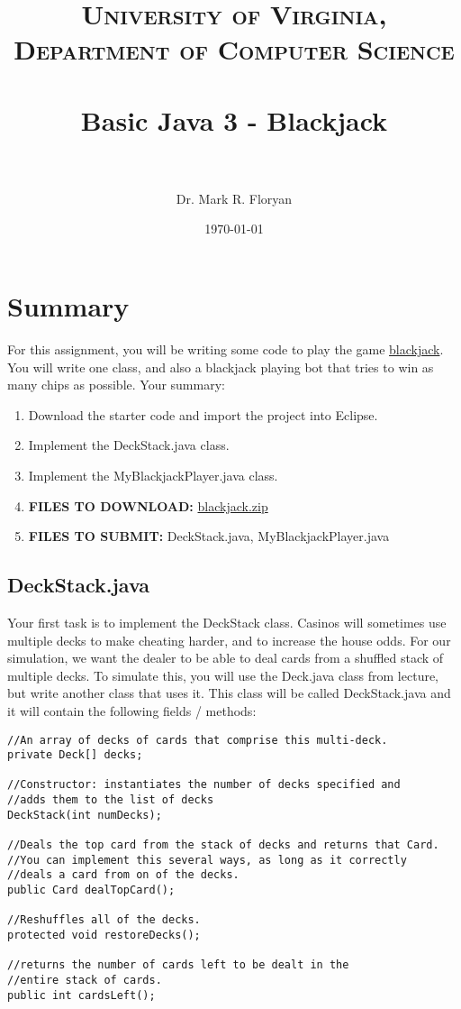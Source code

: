 \documentclass[paper=a4, fontsize=11pt, parskip=full]{scrartcl} %
\title{
\normalfont \normalsize
\textsc{University of Virginia, Department of Computer Science} \\ [25pt] %
\horrule{0.5pt} \\[0.4cm] %
\huge Basic Java 3 - Blackjack \\ %
\horrule{2pt} \\[0.5cm] %
}
\author{Dr. Mark R. Floryan} %
\date{\normalsize\today} %
\numberwithin{equation}{section} %
\numberwithin{figure}{section} %
\numberwithin{table}{section} %
\begin{document}
\maketitle %


\section{Summary}

For this assignment, you will be writing some code to play the game \href{https://en.wikipedia.org/wiki/Blackjack}{blackjack}. You will write one class, and also a blackjack playing bot that tries to win as many chips as possible. Your summary:

\begin{enumerate}
	\item Download the starter code and import the project into Eclipse.
	\item Implement the DeckStack.java class.
	\item Implement the MyBlackjackPlayer.java class.
	\item \textbf{FILES TO DOWNLOAD:} \href{https://markfloryan.github.io/dsa1/homeworks/ObjectsAndClasses/code/blackjack.zip}{blackjack.zip}
	\item \textbf{FILES TO SUBMIT:} DeckStack.java, MyBlackjackPlayer.java
\end{enumerate}


\subsection{DeckStack.java}

Your first task is to implement the DeckStack class. Casinos will sometimes use multiple decks to make cheating harder, and to increase the house odds. For our simulation, we want the dealer to be able to deal cards from a shuffled stack of multiple decks. To simulate this, you will use the Deck.java class from lecture, but write another class that uses it. This class will be called DeckStack.java and it will contain the following fields / methods:

\begin{lstlisting}
//An array of decks of cards that comprise this multi-deck.
private Deck[] decks;

//Constructor: instantiates the number of decks specified and
//adds them to the list of decks
DeckStack(int numDecks);

//Deals the top card from the stack of decks and returns that Card.
//You can implement this several ways, as long as it correctly
//deals a card from on of the decks.
public Card dealTopCard();

//Reshuffles all of the decks.
protected void restoreDecks();

//returns the number of cards left to be dealt in the
//entire stack of cards.
public int cardsLeft();
\end{lstlisting}
\end{document}
